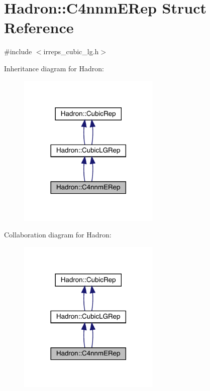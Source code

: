 \hypertarget{structHadron_1_1C4nnmERep}{}\section{Hadron\+:\+:C4nnm\+E\+Rep Struct Reference}
\label{structHadron_1_1C4nnmERep}


{\ttfamily \#include $<$irreps\+\_\+cubic\+\_\+lg.\+h$>$}



Inheritance diagram for Hadron\+:\nopagebreak
\begin{figure}[H]
\begin{center}
\leavevmode
\includegraphics[width=192pt]{db/dd4/structHadron_1_1C4nnmERep__inherit__graph}
\end{center}
\end{figure}


Collaboration diagram for Hadron\+:\nopagebreak
\begin{figure}[H]
\begin{center}
\leavevmode
\includegraphics[width=192pt]{d0/db5/structHadron_1_1C4nnmERep__coll__graph}
\end{center}
\end{figure}
